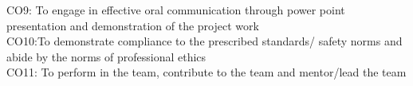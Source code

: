 \begin{titlepage}
CO9: To engage in effective oral communication through power point presentation and demonstration of the project work\\ 
CO10:To demonstrate compliance to the prescribed standards/ safety norms and abide by the norms of professional ethics\\
CO11: To perform in the team, contribute to the team and mentor/lead the team
\newpage
\begin{table}[ht]
\caption*{\textbf{CO-PO Mapping}}
\end{table}
\end{titlepage}
